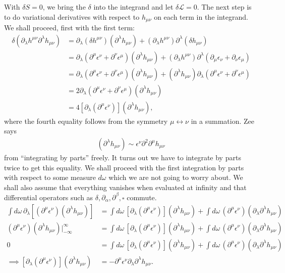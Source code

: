 \documentclass{book}
\theoremstyle{definition}
\newcommand{\p}{\partial}
\newcommand{\lag}{\mathcal{L}}
\newcommand{\nn}{\nonumber}
\begin{document}
With $\delta S = 0$, we bring the $\delta$ into the integrand and let $\delta \lag = 0$. The next step is to do variational derivatives with respect to $h_{\mu\nu}$ on each term in the integrand. We shall proceed, first with the first term:
\begin{align}
\delta(\p_\lambda h^{\mu\nu}\p^\lambda h_{\mu\nu}) &= \p_\lambda (\delta h^{\mu\nu})(\p^\lambda h_{\mu\nu}) + (\p_\lambda h^{\mu\nu})\p^\lambda( \delta h_{\mu\nu} )\nn\\
&= \p_\lambda (\p^\mu \epsilon^\nu + \p^\nu \epsilon^\mu)(\p^\lambda h_{\mu\nu}) + (\p_\lambda h^{\mu\nu})\p^\lambda (\p_\mu \epsilon_\nu + \p_\nu \epsilon_\mu)\nn\\
&= \p_\lambda (\p^\mu \epsilon^\nu + \p^\nu \epsilon^\mu)(\p^\lambda h_{\mu\nu}) + (\p^\lambda h_{\mu\nu})\p_\lambda (\p^\mu \epsilon^\nu + \p^\nu \epsilon^\mu)\nn\\
&= 2\p_\lambda (\p^\mu \epsilon^\nu + \p^\nu \epsilon^\mu)(\p^\lambda h_{\mu\nu})\nn\\
&= 4[\p_\lambda (\p^\mu \epsilon^\nu)](\p^\lambda h_{\mu\nu}),
\end{align}
where the fourth equality follows from the symmetry $\mu\leftrightarrow \nu$ in a summation. Zee says 
\begin{align}
[\p_\lambda (\p^\mu \epsilon^\nu)](\p^\lambda h_{\mu\nu}) \sim \epsilon^\nu \p^2 \p^\mu h_{\mu\nu}
\end{align}
from ``integrating by parts'' freely. It turns out we have to integrate by parts twice to get this equality. We shall proceed with the first integration by parts with respect to some measure $d\omega$ which we are not going to worry about. We shall also assume that everything vanishes when evaluated at infinity and that differential operators such as $\delta, \p_\alpha, \p^\beta, \square$ commute.
\begin{align}
\int d\omega \, \p_\lambda[(\p^\mu \epsilon^\nu)(\p^\lambda h_{\mu\nu})] &= \int d\omega\, [\p_\lambda(\p^\mu\epsilon^\nu)](\p^\lambda h_{\mu\nu}) + \int d\omega\, (\p^\mu\epsilon^\nu)(\p_\lambda \p^\lambda h_{\mu\nu}) \nn\\
(\p^\mu \epsilon^\nu)(\p^\lambda h_{\mu\nu})\bigg\vert_{-\infty}^\infty&= \int d\omega\, [\p_\lambda(\p^\mu\epsilon^\nu)](\p^\lambda h_{\mu\nu}) + \int d\omega\, (\p^\mu\epsilon^\nu)(\p_\lambda \p^\lambda h_{\mu\nu})\nn\\
0  &=  \int d\omega\, [\p_\lambda(\p^\mu\epsilon^\nu)](\p^\lambda h_{\mu\nu}) + \int d\omega\, (\p^\mu\epsilon^\nu)(\p_\lambda \p^\lambda h_{\mu\nu})\nn\\
\implies [\p_\lambda(\p^\mu \epsilon^\nu)] (\p^\lambda h_{\mu\nu})  &= -\p^\mu \epsilon^\nu \p_\lambda \p^\lambda h_{\mu\nu}.
\end{align}
\end{document}
